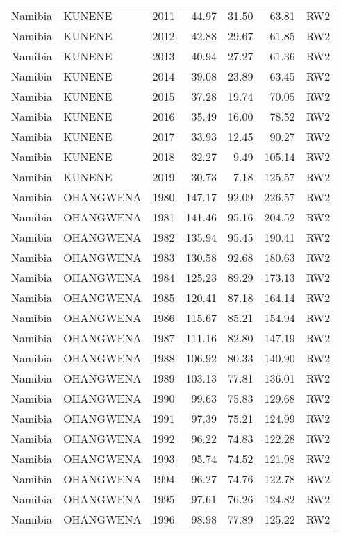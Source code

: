 \begin{longtable}{lllrrrl}
  Namibia & KUNENE & 2011 & 44.97 & 31.50 & 63.81 & RW2 \\ 
  Namibia & KUNENE & 2012 & 42.88 & 29.67 & 61.85 & RW2 \\ 
  Namibia & KUNENE & 2013 & 40.94 & 27.27 & 61.36 & RW2 \\ 
  Namibia & KUNENE & 2014 & 39.08 & 23.89 & 63.45 & RW2 \\ 
  Namibia & KUNENE & 2015 & 37.28 & 19.74 & 70.05 & RW2 \\ 
  Namibia & KUNENE & 2016 & 35.49 & 16.00 & 78.52 & RW2 \\ 
  Namibia & KUNENE & 2017 & 33.93 & 12.45 & 90.27 & RW2 \\ 
  Namibia & KUNENE & 2018 & 32.27 & 9.49 & 105.14 & RW2 \\ 
  Namibia & KUNENE & 2019 & 30.73 & 7.18 & 125.57 & RW2 \\ 
  Namibia & OHANGWENA & 1980 & 147.17 & 92.09 & 226.57 & RW2 \\ 
  Namibia & OHANGWENA & 1981 & 141.46 & 95.16 & 204.52 & RW2 \\ 
  Namibia & OHANGWENA & 1982 & 135.94 & 95.45 & 190.41 & RW2 \\ 
  Namibia & OHANGWENA & 1983 & 130.58 & 92.68 & 180.63 & RW2 \\ 
  Namibia & OHANGWENA & 1984 & 125.23 & 89.29 & 173.13 & RW2 \\ 
  Namibia & OHANGWENA & 1985 & 120.41 & 87.18 & 164.14 & RW2 \\ 
  Namibia & OHANGWENA & 1986 & 115.67 & 85.21 & 154.94 & RW2 \\ 
  Namibia & OHANGWENA & 1987 & 111.16 & 82.80 & 147.19 & RW2 \\ 
  Namibia & OHANGWENA & 1988 & 106.92 & 80.33 & 140.90 & RW2 \\ 
  Namibia & OHANGWENA & 1989 & 103.13 & 77.81 & 136.01 & RW2 \\ 
  Namibia & OHANGWENA & 1990 & 99.63 & 75.83 & 129.68 & RW2 \\ 
  Namibia & OHANGWENA & 1991 & 97.39 & 75.21 & 124.99 & RW2 \\ 
  Namibia & OHANGWENA & 1992 & 96.22 & 74.83 & 122.28 & RW2 \\ 
  Namibia & OHANGWENA & 1993 & 95.74 & 74.52 & 121.98 & RW2 \\ 
  Namibia & OHANGWENA & 1994 & 96.27 & 74.76 & 122.78 & RW2 \\ 
  Namibia & OHANGWENA & 1995 & 97.61 & 76.26 & 124.82 & RW2 \\ 
  Namibia & OHANGWENA & 1996 & 98.98 & 77.89 & 125.22 & RW2 \\ 

\end{longtable}
